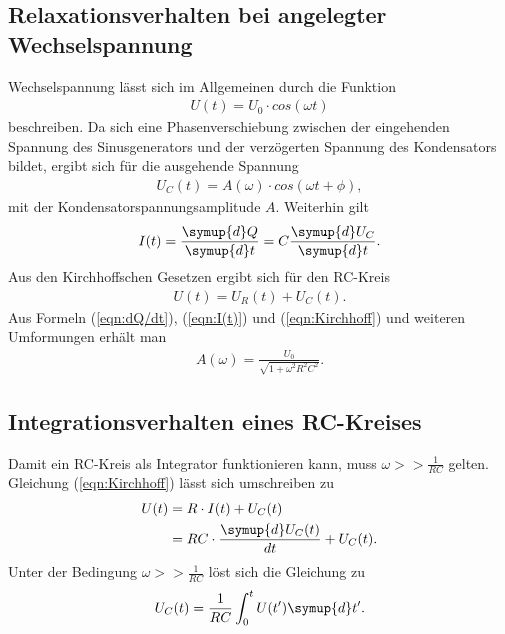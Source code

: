 \subsection{Relaxationsverhalten bei angelegter Wechselspannung}
\label{sec:RelaxationsverhaltenbeiangelegterWechselspannung}

Wechselspannung lässt sich im Allgemeinen durch die Funktion
\begin{align*}
    U(t)=U_0 \cdot cos(\omega t)
\end{align*}
beschreiben. Da sich eine Phasenverschiebung zwischen der eingehenden Spannung des Sinusgenerators und der verzögerten Spannung des Kondensators bildet,
ergibt sich für die ausgehende Spannung
\begin{align*}
    U_{C}(t)=A(\omega)\cdot cos(\omega t +\phi),
\end{align*}
mit der Kondensatorspannungsamplitude $A$. Weiterhin gilt
\begin{align}
    \label{eqn:I(t)}
    I(t)=\frac{\symup{d}Q}{\symup{d}t}=C\frac{\symup{d}U_C}{\symup{d}t}.
\end{align}
Aus den Kirchhoffschen Gesetzen ergibt sich für den RC-Kreis
\begin{align}
    \label{eqn:Kirchhoff}
    U(t)=U_{R}(t)+U_{C}(t).
\end{align}
Aus Formeln (\ref{eqn:dQ/dt}), (\ref{eqn:I(t)}) und (\ref{eqn:Kirchhoff}) und weiteren Umformungen erhält man
\begin{align}
    \label{eqn:Amplitude}
    A(\omega)=\frac{U_0}{\sqrt{1+\omega^2 R^2 C^2}}.
\end{align}

\subsection{Integrationsverhalten eines RC-Kreises}
\label{sec:IntegrationsverhalteneinesRC-Kreises}

Damit ein RC-Kreis als Integrator funktionieren kann, muss $\omega >> \frac{1}{RC}$ gelten.
Gleichung (\ref{eqn:Kirchhoff}) lässt sich umschreiben zu
\begin{align*}
    U(t)&=R \cdot I(t)+U_{C}(t)\\
        &=RC\cdot \frac{\symup{d}U_{C}(t)}{dt}+U_{C}(t).
\end{align*}
Unter der Bedingung $\omega >>\frac{1}{RC}$ löst sich die Gleichung zu
\begin{align}
    \label{eqn:Kondensatorspannung}
    U_{C}(t)=\frac{1}{RC}\int_{0}^{t} U(t')\symup{d}t'.
\end{align}

\cite{sample}
